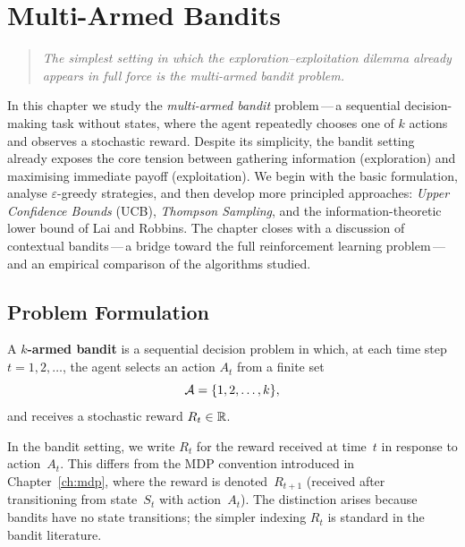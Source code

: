 \chapter{Multi-Armed Bandits}
\label{ch:bandits}

\begin{quote}
\itshape
The simplest setting in which the exploration--exploitation dilemma already appears in full force is the multi-armed bandit problem.
\end{quote}

\bigskip

In this chapter we study the \emph{multi-armed bandit} problem\,---\,a sequential decision-making task without states, where the agent repeatedly chooses one of $k$ actions and observes a stochastic reward.  Despite its simplicity, the bandit setting already exposes the core tension between gathering information (exploration) and maximising immediate payoff (exploitation).  We begin with the basic formulation, analyse $\varepsilon$-greedy strategies, and then develop more principled approaches: \emph{Upper Confidence Bounds} (UCB), \emph{Thompson Sampling}, and the information-theoretic lower bound of Lai and Robbins.  The chapter closes with a discussion of contextual bandits\,---\,a bridge toward the full reinforcement learning problem\,---\,and an empirical comparison of the algorithms studied.


\section{Problem Formulation}
\label{sec:bandit-formulation}

\begin{definition}
\label{def:k-armed-bandit}
A \textbf{$k$-armed bandit} is a sequential decision problem in which, at each time step $t=1,2,\dots$, the agent selects an action $A_t$ from a finite set
\[
\mathcal{A} = \{1,2,\dots,k\},
\]
and receives a stochastic reward $R_t\in\mathbb{R}$.
\end{definition}

\begin{remark}
In the bandit setting, we write $R_t$ for the reward received at time~$t$ in response to action~$A_t$.  This differs from the MDP convention introduced in Chapter~\ref{ch:mdp}, where the reward is denoted~$R_{t+1}$ (received after transitioning from state~$S_t$ with action~$A_t$).  The distinction arises because bandits have no state transitions; the simpler indexing $R_t$ is standard in the bandit literature.
\end{remark}

